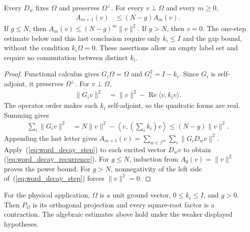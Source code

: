 \begin{theorem}
\label{thm:contraction_word_decay}
\leanok
{}
Every $D_w$ fixes $\Omega$ and preserves $\Omega^\perp$.
For every $v\perp\Omega$ and every $m\ge0$,
\begin{align}
 A_{m+1}(v)&\le (N-g) A_m(v).
 \label{eq:word_decay_recurrence}
\end{align}
If $g\le N$, then $A_m(v)\le(N-g)^m\|v\|^2$.
If $g>N$, then $v=0$.
The one-step estimate below and this last conclusion require only
$k_i\le I$ and the gap bound, without the condition $k_i\Omega=0$.
These assertions allow an empty label set and require no commutation
between distinct $k_i$.
\end{theorem}
\begin{proof}
\leanok
Functional calculus gives $G_i\Omega=\Omega$ and $G_i^2=I-k_i$.
Since $G_i$ is self-adjoint, it preserves $\Omega^\perp$.
For $v\perp\Omega$,
\begin{align}
 \|G_iv\|^2&=\|v\|^2-\operatorname{Re}\langle v,k_iv\rangle.
 \label{eq:word_decay_norm}
\end{align}
The operator order makes each $k_i$ self-adjoint, so the quadratic forms
are real. Summing gives
\begin{align}
 \sum_i\|G_iv\|^2
 &=N\|v\|^2-\left\langle v,\left(\sum_i k_i\right)v\right\rangle
 \le(N-g)\|v\|^2.
 \label{eq:word_decay_step}
\end{align}
Appending the last letter gives
$A_{m+1}(v)=\sum_{w\in\mathcal I^m}\sum_i\|G_iD_wv\|^2$.
Apply~(\ref{eq:word_decay_step}) to each excited vector $D_wv$ to obtain
(\ref{eq:word_decay_recurrence}). For $g\le N$, induction from
$A_0(v)=\|v\|^2$ proves the power bound.
For $g>N$, nonnegativity of the left side of~(\ref{eq:word_decay_step})
forces $\|v\|^2=0$.
\end{proof}

For the physical application, $\Omega$ is a unit ground vector,
$0\le k_i\le I$, and $g>0$.  Then $P_\Omega$ is its orthogonal
projection and every square-root factor is a contraction.  The algebraic
estimates above hold under the weaker displayed hypotheses.
